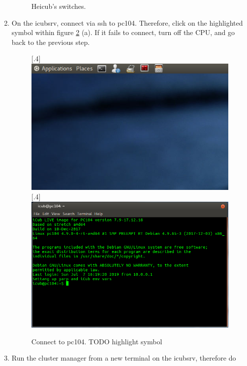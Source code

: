 \begin{enumerate}
\begin{figure}[h]
		\caption{Heicub's switches.}
		\label{fig::B1_cpu_motor}
	\end{figure}
	\item On the icubsrv, connect via ssh to pc104. Therefore, click on the highlighted symbol within figure \ref{fig::B1_pc104} (a). If it fails to connect, turn off the CPU, and go back to the previous step.
	\begin{figure}[h]
		\centering
		[.4\linewidth]{\includegraphics[scale=.326]{chapters/07_appendix/img/task_bar.png}}
		[.4\linewidth]{\includegraphics[scale=.22]{chapters/07_appendix/img/terminal_pc104.png}}
		\caption{Connect to pc104. TODO highlight symbol}
		\label{fig::B1_pc104}
	\end{figure}
	\item Run the cluster manager from a new terminal on the icubsrv, therefore do \newline {}

\end{enumerate}
